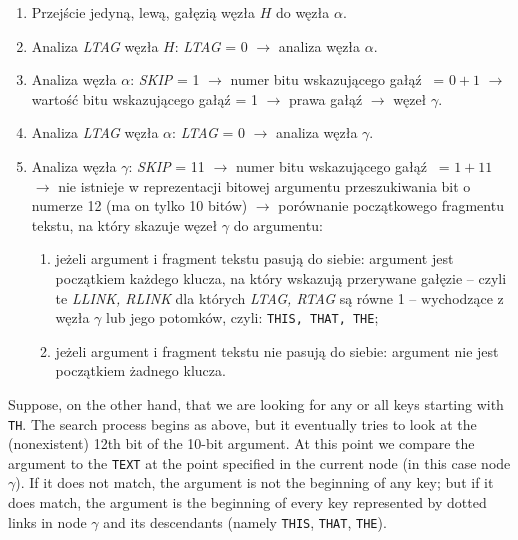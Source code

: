 	\begin{enumerate}
		\item Przejście jedyną, lewą, gałęzią węzła $H$ do węzła $\alpha$.
		
		\item Analiza \emph{LTAG} węzła $H$: \newline
		\emph{LTAG} = 0 $\rightarrow$ analiza węzła $\alpha$.
		
		\item Analiza węzła $\alpha$: \newline
		\emph{SKIP} = 1 $\rightarrow$ numer bitu wskazującego gałąź  = $0+1$ $\rightarrow$ wartość bitu wskazującego gałąź = 1 $\rightarrow$ prawa gałąź $\rightarrow$ węzeł $\gamma$.
		
		\item Analiza \emph{LTAG} węzła $\alpha$: \newline
		\emph{LTAG} = 0 $\rightarrow$ analiza węzła $\gamma$.
		
		\item Analiza węzła $\gamma$: \newline
		\emph{SKIP} = 11 $\rightarrow$ numer bitu wskazującego gałąź  = $1+11$ $\rightarrow$ nie istnieje w reprezentacji bitowej argumentu przeszukiwania bit o numerze 12 (ma on tylko 10 bitów) $\rightarrow$ porównanie początkowego fragmentu tekstu, na który skazuje węzeł $\gamma$ do argumentu:
		\begin{enumerate}
			\item jeżeli argument i fragment tekstu pasują do siebie: \newline
			argument jest początkiem każdego klucza, na który wskazują przerywane gałęzie -- czyli te \emph{LLINK, RLINK} dla których \emph{LTAG, RTAG} są równe 1 -- wychodzące z węzła $\gamma$ lub jego potomków, czyli: \texttt{THIS, THAT, THE};
			\item jeżeli argument i fragment tekstu nie pasują do siebie: \newline
			argument nie jest początkiem żadnego klucza.
		\end{enumerate}
	\end{enumerate}
	
	\ifsourcematerial
	\begin{displayquote}
		\color{ao(english)}
		Suppose, on the other hand, that we are looking for any or all keys starting
		with \texttt{TH}. The search process begins as above, but it eventually tries to look at the (nonexistent) 12th bit of the 10-bit argument. At this point we compare the
		argument to the \texttt{TEXT} at the point specified in the current node (in this case node $\gamma$). If it does not match, the argument is not the beginning of any key; but if it does match, the argument is the beginning of every key represented by dotted
		links in node $\gamma$ and its descendants (namely \texttt{THIS}, \texttt{THAT}, \texttt{THE}). \newline
	\end{displayquote}
	\fi
	

